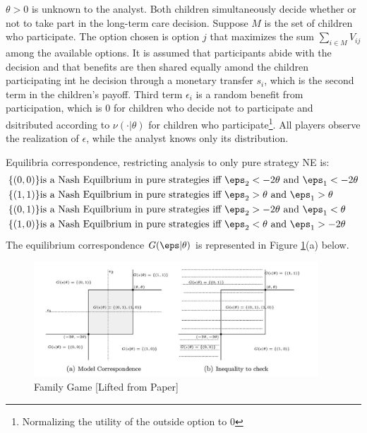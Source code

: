 $\theta > 0$ is unknown to the analyst. Both children simultaneously decide whether or not to take part in the long-term care decision. Suppose $M$ is the set of children who participate. The option chosen is option $j$ that maximizes the sum $\sum_{i\in M} V_{ij}$ among the available options. It is assumed that participants abide with the decision and that benefits are then shared equally amond the children participating int he decision through a monetary transfer $s_i$, which is the second term in the children's payoff. Third term $\epsilon_i$ is a random benefit from participation, which is $0$ for children who decide not to participate and dsitributed according to $\nu(\cdot | \theta)$ for children who participate\footnote{Normalizing the utility of the outside option to 0}. All players observe the realization of $\epsilon$, while the analyst knows only its distribution. 

Equilibria correspondence, restricting analysis to only pure strategy NE is:
\begin{align*}
	\{(0,0)\}&\text{is a Nash Equilbrium in pure strategies iff }\eps_2 < -2\theta\text{ and }\eps_1 < -2\theta \\
	\{(1,1)\}&\text{is a Nash Equilbrium in pure strategies iff }\eps_2 > \theta\text{ and }\eps_1  > \theta \\
	\{(0,1)\}&\text{is a Nash Equilbrium in pure strategies iff }\eps_2 > -2\theta\text{ and }\eps_1  < \theta \\
	\{(1,0)\}&\text{is a Nash Equilbrium in pure strategies iff }\eps_2 < \theta\text{ and }\eps_1  > -2\theta 
\end{align*}
The equilibrium correspondence $G(\eps|\theta)$ is represented in Figure \ref{fig:GH-1}(a) below.
\begin{figure}[htb!]
	\centering
	\includegraphics[width=0.95\textwidth]{figures/GH-Fig1}
	\caption{Family Game [Lifted from Paper]}
	\label{fig:GH-1}
\end{figure}

